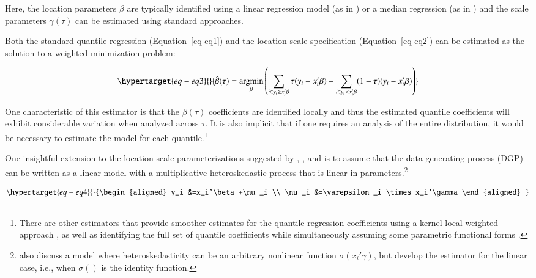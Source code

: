 \documentclass[
  authoryear,
  review,
  1p]{elsarticle}
\begin{document}
Here, the location parameters \(\beta\) are typically identified using a
linear regression model (as in \citet{mss2019}) or a median regression
(as in \citet{zhao2000}) and the scale parameters \(\gamma(\tau)\) can
be estimated using standard approaches.

Both the standard quantile regression (Equation~\ref{eq-eq1}) and the
location-scale specification (Equation~\ref{eq-eq2}) can be estimated as
the solution to a weighted minimization problem:

\begin{equation}\protect\hypertarget{eq-eq3}{}{\hat{\beta}(\tau) = \underset{\beta}{\operatorname{argmin}}
\left( \sum_{i\in y_i\geq x_i'\beta} \tau (y_i - x_i'\beta) - \sum_{i\in y_i<x_i'\beta} (1-\tau)(y_i - x_i'\beta) \right)
}\label{eq-eq3}\end{equation}

One characteristic of this estimator is that the \(\beta(\tau)\)
coefficients are identified locally and thus the estimated quantile
coefficients will exhibit considerable variation when analyzed across
\(\tau\). It is also implicit that if one requires an analysis of the
entire distribution, it would be necessary to estimate the model for
each quantile.\footnote{There are other estimators that provide smoother
  estimates for the quantile regression coefficients using a kernel
  local weighted approach \citep{kaplan2017}, as well as identifying the
  full set of quantile coefficients while simultaneously assuming some
  parametric functional forms \citep{frumentobotai2016}.}

One insightful extension to the location-scale parameterizations
suggested by \citet{he1997}, \citet{cameron2005}, and \citet{mss2019} is
to assume that the data-generating process (DGP) can be written as a
linear model with a multiplicative heteroskedastic process that is
linear in parameters.\footnote{\citet{mss2019} also discuss a model
  where heteroskedasticity can be an arbitrary nonlinear function
  \(\sigma(x_i'\gamma)\), but develop the estimator for the linear case,
  i.e., when \(\sigma()\) is the identity function.}

\begin{equation}\protect\hypertarget{eq-eq4}{}{\begin{aligned}
y_i &=x_i'\beta+\nu_i \\
\nu_i &=\varepsilon_i \times x_i'\gamma 
\end{aligned}
}\label{eq-eq4}\end{equation}
\end{document}
